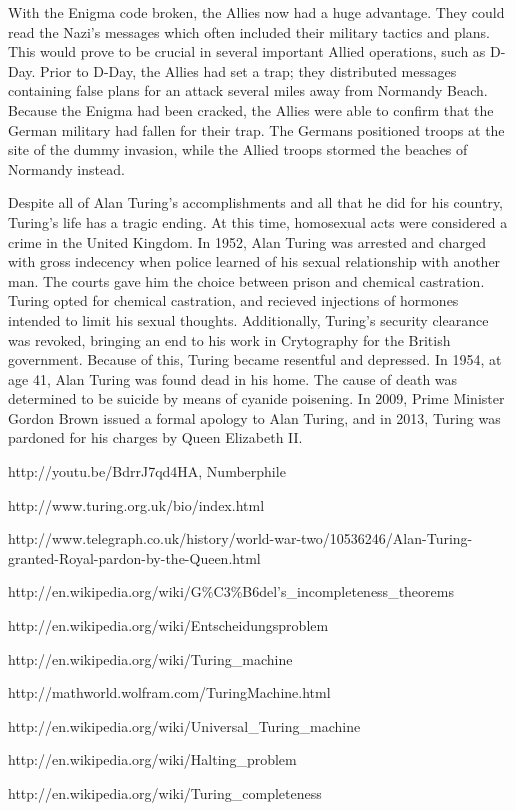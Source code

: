 \documentclass[12pt]{article}
\theoremstyle{mystyle}
\begin{document}
With the Enigma code broken, the Allies now had a huge advantage. They could
read the Nazi's messages which often included their military tactics and plans.
This would prove to be crucial in several important Allied operations, such as
D-Day. Prior to D-Day, the Allies had set a trap; they distributed messages
containing false plans for an attack several miles away from Normandy Beach. Because the
Enigma had been cracked, the Allies were able to confirm that the German
military  had fallen for their trap. The Germans positioned troops at the site
of the dummy invasion, while the Allied troops stormed the beaches of Normandy instead.


Despite all of Alan Turing's accomplishments and all that he did for his
country, Turing's life has a tragic ending. At this time, homosexual acts were
considered a crime in the United Kingdom. In 1952, Alan Turing was arrested and
charged with gross indecency when police learned of his sexual relationship
with another man. The courts gave him the choice between prison and chemical
castration. Turing opted for chemical castration, and recieved injections of
hormones intended to limit his sexual thoughts. Additionally, Turing's security
clearance was revoked, bringing an end to his work in Crytography for the
British government. Because of this, Turing became resentful and depressed. In
1954, at age 41, Alan Turing was found dead in his home. The cause of death was
determined to be suicide by means of cyanide poisening. In 2009, Prime Minister
Gordon Brown issued a formal apology to Alan Turing, and in 2013, Turing was 
pardoned for his charges by Queen Elizabeth II.


\begin{thebibliography}{9}

http://youtu.be/BdrrJ7qd4HA,
Numberphile

\bibitem{}
http://www.turing.org.uk/bio/index.html

\bibitem{}
http://www.telegraph.co.uk/history/world-war-two/10536246/Alan-Turing-granted-Royal-pardon-by-the-Queen.html

http://en.wikipedia.org/wiki/G\%C3\%B6del's\_incompleteness\_theorems

http://en.wikipedia.org/wiki/Entscheidungsproblem

\bibitem{}
http://en.wikipedia.org/wiki/Turing\_machine

\bibitem{}
http://mathworld.wolfram.com/TuringMachine.html

\bibitem{}
http://en.wikipedia.org/wiki/Universal\_Turing\_machine

\bibitem{}
http://en.wikipedia.org/wiki/Halting\_problem

http://en.wikipedia.org/wiki/Turing\_completeness


\end{thebibliography}
\end{document}
